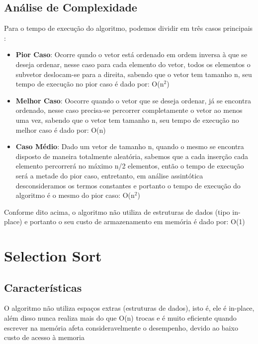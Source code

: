 \documentclass[12pt]{article}
\begin{document}
\subsection{Análise de Complexidade}
Para o tempo de execução do algoritmo, podemos dividir em três casos principais \cite{insertionSortAnalysis}:
    \begin{itemize}
        \item  \textbf{Pior Caso}: Ocorre qundo o vetor está ordenado em ordem inversa à que se deseja ordenar, nesse caso para cada elemento do vetor, todos os elementos o subvetor deslocam-se para a direita, sabendo que o vetor tem tamanho n, seu tempo de execução no pior caso é dado por: O(n$^2$)
        
        \item  \textbf{Melhor Caso}: Oocorre quando o vetor que se deseja ordenar, já se encontra ordenado, nesse caso precisa-se percorrer completamente o vetor ao menos uma vez, sabendo que o vetor tem tamanho n, seu tempo de execução no melhor caso é dado por: O(n)
        
        \item  \textbf{Caso Médio}: Dado um vetor de tamanho n, quando o mesmo se encontra disposto de maneira totalmente aleatória, sabemos que a cada inserção cada elemento percorrerá no máximo n/2 elementos, então o tempo de execução será a metade do pior caso, entretanto, em análise assintótica desconsideramos os termos constantes e portanto o tempo de execução do algoritmo é o mesmo do pior caso: O(n$^2$)
    \end{itemize}
Conforme dito acima, o algoritmo não utiliza de estruturas de dados (tipo in-place) e portanto o seu custo de armazenamento em memória é dado por: O(1)

\section{Selection Sort} \label{sec:firstpage}
\subsection{Características}
O algoritmo não utiliza espaços extras (estruturas de dados), isto é, ele é in-place, além disso nunca realiza mais do que O(n) trocas e é muito eficiente quando escrever na memória afeta consideravelmente o desempenho, devido ao baixo custo de acesso à memoria
\end{document}

